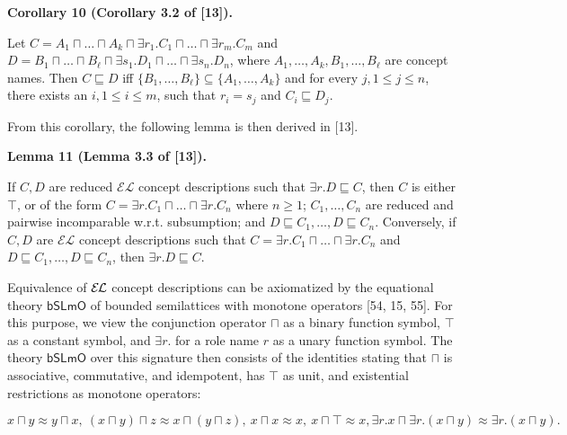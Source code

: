 \par\medskip\noindent\textbf{Corollary 10 (Corollary 3.2 of [13]).}\par
 
 
Let $C=A_{1}\sqcap\ldots\sqcap A_{k}\sqcap\exists r_{1}.C_{1}\sqcap\ldots\sqcap%
\exists r_{m}.C_{m}$ and $D=B_{1}\sqcap\ldots\sqcap B_{\ell}\sqcap\exists s_{1}.D_{1}\sqcap\ldots\sqcap%
\exists s_{n}.D_{n}$, where $A_{1},\ldots,A_{k},B_{1},\ldots,B_{\ell}$ are concept names. Then $C\sqsubseteq D$ iff $\{B_{1},\ldots,B_{\ell}\}\subseteq\{A_{1},\ldots,A_{k}\}$ and for every $j,1\leq j\leq n$, there exists an $i,1\leq i\leq m$, such that $r_{i}=s_{j}$ and $C_{i}\sqsubseteq D_{j}$.\par
 
 
 
 
From this corollary, the following lemma is then derived in [13].\par
 
 
 
\par\medskip\noindent\textbf{Lemma 11 (Lemma 3.3 of [13]).}\par
 
 
If $C,D$ are reduced $\mathcal{EL}$ concept descriptions such that $\exists r.D\sqsubseteq C$, then $C$ is either $\top$, or of the form $C=\exists r.C_{1}\sqcap\ldots\sqcap\exists r.C_{n}$ where $n\geq 1$; $C_{1},\ldots,C_{n}$ are reduced and pairwise incomparable w.r.t. subsumption; and $D\sqsubseteq C_{1},\ldots,D\sqsubseteq C_{n}$. Conversely, if $C,D$ are $\mathcal{EL}$ concept descriptions such that $C=\exists r.C_{1}\sqcap\ldots\sqcap\exists r.C_{n}$ and $D\sqsubseteq C_{1},\ldots,D\sqsubseteq C_{n}$, then $\exists r.D\sqsubseteq C$.\par
 
 
 
 
Equivalence of $\mathcal{E\mkern-1.618muL}$ concept descriptions can be axiomatized by the equational theory $\mathsf{bSLmO}$ of bounded semilattices with monotone operators [54, 15, 55]. For this purpose, we view the conjunction operator $\sqcap$ as a binary function symbol, $\top$ as a constant symbol, and $\exists r.$ for a role name $r$ as a unary function symbol. The theory $\mathsf{bSLmO}$ over this signature then consists of the identities stating that $\sqcap$ is associative, commutative, and idempotent, has $\top$ as unit, and existential restrictions as monotone operators:\par
    \[x\sqcap y\approx y\sqcap x,\ (x\sqcap y)\sqcap z\approx x\sqcap(y\sqcap z),\ x%
\sqcap x\approx x,\ x\sqcap\top\approx x,\exists r.x\sqcap\exists r.(x\sqcap y%
)\approx\exists r.(x\sqcap y).\]    
 
